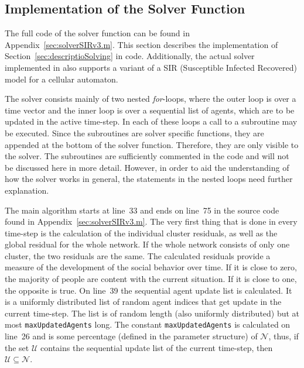
\subsection{Implementation of the Solver Function}
\label{sec:implementSolver}

The full code of the solver function can be found in
Appendix~\ref{sec:solverSIRv3.m}.  This section describes the implementation of
Section~\ref{sec:descriptioSolving} in \matlab code.  Additionally, the actual
solver implemented in \matlab also supports a variant of a SIR (Susceptible
Infected Recovered) model for a cellular automaton.

The solver consists mainly of two nested \textsl{for}-loops, where the outer
loop is over a time vector and the inner loop is over a sequential list of
agents, which are to be updated in the active time-step.  In each of these
loops a call to a subroutine may be executed.  Since the subroutines are solver
specific functions, they are appended at the bottom of the solver function.
Therefore, they are only visible to the solver.  The subroutines are
sufficiently commented in the code and will not be discussed here in more
detail.  However, in order to aid the understanding of how the solver works in
general, the statements in the nested loops need further explanation.

The main algorithm starts at line~33 and ends on line~75 in the source code
found in Appendix~\ref{sec:solverSIRv3.m}.  The very first thing that is done
in every time-step is the calculation of the individual cluster residuals, as
well as the global residual for the whole network.  If the whole network
consists of only one cluster, the two residuals are the same.  The calculated
residuals provide a measure of the development of the social behavior over
time.  If it is close to zero, the majority of people are content with the
current situation.  If it is close to one, the opposite is true.  On line~39
the sequential agent update list is calculated.  It is a uniformly distributed
list of random agent indices that get update in the current time-step.  The
list is of random length (also uniformly distributed) but at most
\texttt{maxUpdatedAgents} long.  The constant \texttt{maxUpdatedAgents} is
calculated on line~26 and is some percentage (defined in the parameter
structure) of $\mathcal{N}$, thus, if the set $\mathcal{U}$ contains the
sequential update list of the current time-step, then
$\mathcal{U}\subseteq\mathcal{N}$.

